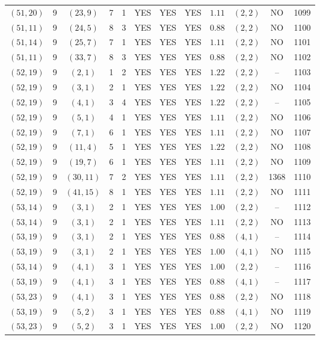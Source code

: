 \begin{longtable}{|c|c|c|c|c|c|c|c|c|c|c|c|}
$(51,20)$ & 9 & $(23,9)$ & 7 & 1 & YES & YES & YES & $1.11$ & $(2,2)$ & NO & 1099\\
$(51,11)$ & 9 & $(24,5)$ & 8 & 3 & YES & YES & YES & $0.88$ & $(2,2)$ & NO & 1100\\
$(51,14)$ & 9 & $(25,7)$ & 7 & 1 & YES & YES & YES & $1.11$ & $(2,2)$ & NO & 1101\\
$(51,11)$ & 9 & $(33,7)$ & 8 & 3 & YES & YES & YES & $0.88$ & $(2,2)$ & NO & 1102\\
$(52,19)$ & 9 & $(2,1)$ & 1 & 2 & YES & YES & YES & $1.22$ & $(2,2)$ & -- & 1103\\
$(52,19)$ & 9 & $(3,1)$ & 2 & 1 & YES & YES & YES & $1.22$ & $(2,2)$ & NO & 1104\\
$(52,19)$ & 9 & $(4,1)$ & 3 & 4 & YES & YES & YES & $1.22$ & $(2,2)$ & -- & 1105\\
$(52,19)$ & 9 & $(5,1)$ & 4 & 1 & YES & YES & YES & $1.11$ & $(2,2)$ & NO & 1106\\
$(52,19)$ & 9 & $(7,1)$ & 6 & 1 & YES & YES & YES & $1.11$ & $(2,2)$ & NO & 1107\\
$(52,19)$ & 9 & $(11,4)$ & 5 & 1 & YES & YES & YES & $1.22$ & $(2,2)$ & NO & 1108\\
$(52,19)$ & 9 & $(19,7)$ & 6 & 1 & YES & YES & YES & $1.11$ & $(2,2)$ & NO & 1109\\
$(52,19)$ & 9 & $(30,11)$ & 7 & 2 & YES & YES & YES & $1.11$ & $(2,2)$ & 1368 & 1110\\
$(52,19)$ & 9 & $(41,15)$ & 8 & 1 & YES & YES & YES & $1.11$ & $(2,2)$ & NO & 1111\\
$(53,14)$ & 9 & $(3,1)$ & 2 & 1 & YES & YES & YES & $1.00$ & $(2,2)$ & -- & 1112\\
$(53,14)$ & 9 & $(3,1)$ & 2 & 1 & YES & YES & YES & $1.11$ & $(2,2)$ & NO & 1113\\
$(53,19)$ & 9 & $(3,1)$ & 2 & 1 & YES & YES & YES & $0.88$ & $(4,1)$ & -- & 1114\\
$(53,19)$ & 9 & $(3,1)$ & 2 & 1 & YES & YES & YES & $1.00$ & $(4,1)$ & NO & 1115\\
$(53,14)$ & 9 & $(4,1)$ & 3 & 1 & YES & YES & YES & $1.00$ & $(2,2)$ & -- & 1116\\
$(53,19)$ & 9 & $(4,1)$ & 3 & 1 & YES & YES & YES & $0.88$ & $(4,1)$ & -- & 1117\\
$(53,23)$ & 9 & $(4,1)$ & 3 & 1 & YES & YES & YES & $0.88$ & $(2,2)$ & NO & 1118\\
$(53,19)$ & 9 & $(5,2)$ & 3 & 1 & YES & YES & YES & $0.88$ & $(4,1)$ & NO & 1119\\
$(53,23)$ & 9 & $(5,2)$ & 3 & 1 & YES & YES & YES & $1.00$ & $(2,2)$ & NO & 1120\\

\end{longtable}
